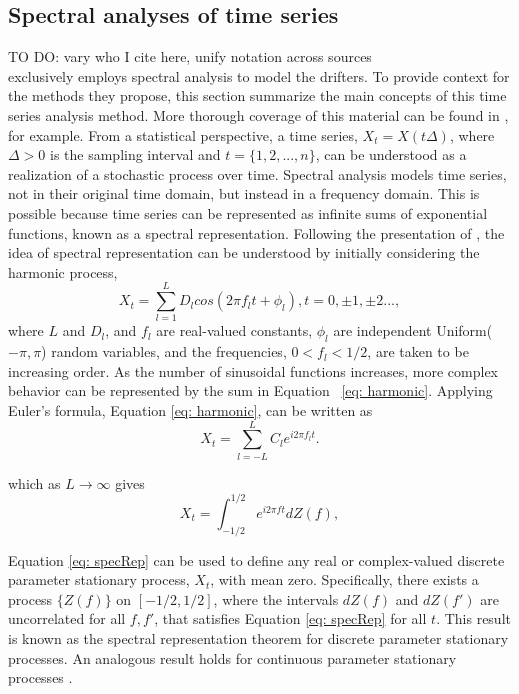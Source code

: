 \documentclass{stat572Style}
\begin{document}
	\subsection{Spectral analyses of time series}
	TO DO: vary who I cite here, unify notation across sources\\
	\indent \citet{Sykulski2016} exclusively employs spectral analysis to model the  drifters.  To provide context for the  methods they propose, this section summarize the main concepts of this time series analysis method. More thorough coverage of this material can be found in  \citep{Percival1993}, for example. From a statistical perspective, a time series, $X_{t} = X(t\Delta)$, where $\Delta > 0 $ is the sampling interval and $t = \{1,2,...,n\}$,  can be understood as a realization of a stochastic process over time. Spectral analysis models time series, not in their original time domain, but instead in a frequency domain. This is possible because time series can be represented as infinite sums of exponential functions, known as a spectral representation. Following the presentation of \citet{Percival1993}, the idea of spectral representation can be understood by initially considering the harmonic process,
    	\begin{equation}
		\label{eq: harmonic}
		X_{t} = \sum_{l=1}^{L}D_{l} cos(2\pi f_{l}t + \phi_{l}),  t = 0, \pm 1, \pm 2...,
	\end{equation}
where $L$ and  $D_{l}$, and $f_{l}$ are real-valued constants, $\phi_{l}$ are independent Uniform($-\pi, \pi$) random variables, and the frequencies, $0 <f_{l} < 1/2$, are taken to be increasing order. As the number of  sinusoidal functions increases,  more complex behavior can be represented by the sum in Equation ~\ref{eq: harmonic}.  Applying Euler's formula,  Equation \ref{eq: harmonic}, can be written as 
	\begin{equation}
		\label{eq: harmonicSpec}
		X_{t} = \sum_{l = -L}^{L} C_{l}e^{i2\pi f_{l} t}.
	\end{equation}
	
\noindent which as $L \rightarrow \infty$  gives
	\begin{equation}
		\label{eq: specRep}
		X_{t} = \int_{-1/2}^{1/2} e^{i2\pi ft}dZ(f),
	\end{equation}

\noindent Equation \ref{eq: specRep} can be used to define any real or complex-valued discrete parameter stationary process, $X_{t}$, with mean zero. Specifically, there exists a process $\{Z(f)\}$ on $[-1/2, 1/2]$,  where the intervals $dZ(f)$ and $dZ(f')$  are uncorrelated for all $f,f'$, that satisfies Equation \ref{eq: specRep} for all $t$\citep{Percival1993}. This result is known as the spectral representation theorem for discrete parameter stationary processes. An analogous result holds for continuous parameter stationary processes \citep{Percival1993}. 
\end{document}
